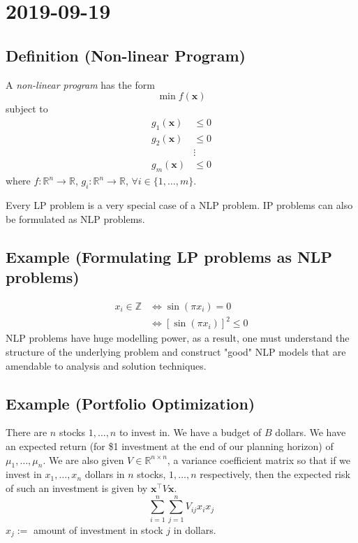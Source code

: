 \section{2019-09-19}
\begin{defbox}
    \subsection{Definition (Non-linear Program)}
    A \emph{non-linear program} has the form
    \[\min f(\bm{x})\]
subject to
\begin{align*}
    g_1(\bm{x})&\le 0\\
    g_2(\bm{x})&\le 0\\
    &\vdots\\
    g_m(\bm{x})&\le 0
\end{align*}
where
$f:\mathbb{R}^n\rightarrow \mathbb{R}$, 
$g_i:\mathbb{R}^n\rightarrow\mathbb{R}$, $\forall i\in\{1,\dots,m\}$.
\end{defbox}

Every LP problem is a very special case of a NLP problem. IP problems can
also be formulated as NLP problems.
\subsection{Example (Formulating LP problems as NLP problems)}
\begin{align*}
    x_i\in\mathbb{Z}&\iff \sin(\pi x_i)=0\\
    &\iff [\sin(\pi x_i)]^2\le 0
\end{align*}
NLP problems have huge modelling power, as a result, one must understand the
structure of the underlying problem and construct "good" NLP models that are
amendable to analysis and solution techniques.

\subsection{Example (Portfolio Optimization)}
There are $n$ stocks $1,\dots,n$ to invest in. We have a budget of $B$ dollars.
We have an expected return (for \$1 investment at the end of our planning
horizon) of $\mu_1,\dots,\mu_n$. We are also given 
$V\in \mathbb{R}^{n\times n}$, a variance coefficient matrix so that if
we invest in $x_1,\dots,x_n$ dollars in $n$ stocks, $1,\dots,n$ respectively,
then the expected risk of such an investment is given by 
$\bm{x}^\top  V\bm{x}$.
\[\sum\limits_{i = 1}^{n}\sum\limits_{j = 1}^{n}V_{ij}x_ix_j\]
$x_j:=$ amount of investment in stock $j$ in dollars.

